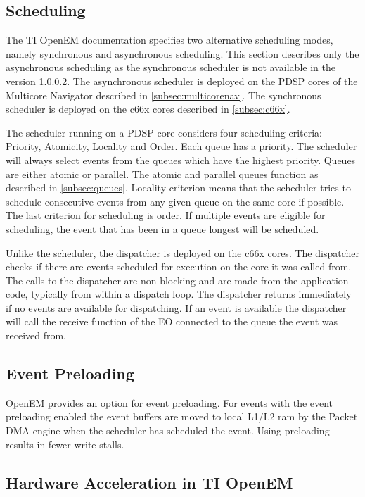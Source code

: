 \subsection{Scheduling}
The TI OpenEM documentation specifies two alternative scheduling modes, namely synchronous and asynchronous scheduling. This section describes only the asynchronous scheduling as the synchronous scheduler is not available in the version 1.0.0.2. The asynchronous scheduler is deployed on the PDSP cores of the Multicore Navigator described in \ref{subsec:multicorenav}. The synchronous scheduler is deployed on the c66x cores described in \ref{subsec:c66x}.  

The scheduler running on a PDSP core considers four scheduling criteria: Priority, Atomicity, Locality and Order. Each queue has a priority. The scheduler will always select events from the queues which have the highest priority. Queues are either atomic or parallel. The atomic and parallel queues function as described in \ref{subsec:queues}. Locality criterion means that the scheduler tries to schedule consecutive events from any given queue on the same core if possible. The last criterion for scheduling is order. If multiple events are eligible for scheduling, the event that has been in a queue longest will be scheduled. \cite{openemwhite}

Unlike the scheduler, the dispatcher is deployed on the c66x cores. The dispatcher checks if there are events scheduled for execution on the core it was called from. The calls to the dispatcher are non-blocking and are made from the application code, typically from within a dispatch loop. The dispatcher returns immediately if no events are available for dispatching. If an event is available the dispatcher will call the receive function of the EO connected to the queue the event was received from. \cite{openemwhite}

\subsection{Event Preloading}
OpenEM provides an option for event preloading. For events with the event preloading enabled the event buffers are moved to local L1/L2 ram by the Packet DMA engine when the scheduler has scheduled the event. Using preloading results in fewer write stalls. \cite{openemwhite}  

\subsection{Hardware Acceleration in TI OpenEM}

